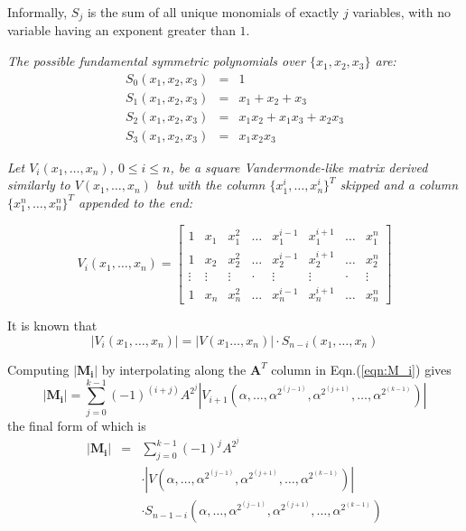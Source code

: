 Informally, $S_j$ is the sum of all unique monomials of exactly $j$ variables, with no variable
having an exponent greater than $1$.
\begin{Example}
{\it The possible fundamental symmetric polynomials over $\{x_1,x_2,x_3\}$ are:
\begin{eqnarray}
S_0(x_1,x_2,x_3) &=& 1 \nonumber \\
S_1(x_1,x_2,x_3) &=& x_1+x_2+x_3 \nonumber \\
S_2(x_1,x_2,x_3) &=& x_1x_2+x_1x_3+x_2x_3 \nonumber \\
S_3(x_1,x_2,x_3) &=& x_1x_2x_3 \nonumber 
\end{eqnarray}
}
\end{Example}

\begin{Proposition}
{\it
Let $V_i(x_1,\dots,x_n)$, $0\leq i\leq n$, be a square Vandermonde-like matrix
derived similarly to $V(x_1,\dots,x_n)$ but with the column $\{x_1^i,\dots,x_n^i\}^T$ skipped and 
a column $\{x_1^n,\dots,x_n^n\}^T$ appended to the end:

\begin{equation}
V_i(x_1,\dots,x_n) 
=
\begin{bmatrix}
1 & x_1 & x_1^2  & \dots  & x_1^{i-1} & x_1^{i+1} & \dots & x_1^n \\
1 & x_2 & x_2^2  & \dots  & x_2^{i-1} & x_2^{i+1} & \dots & x_2^n \\
\vdots & \vdots  & \vdots & \cdot  & \vdots    & \vdots    & \cdot & \vdots    \\
1 & x_n & x_n^2  & \dots  & x_n^{i-1} & x_n^{i+1} & \dots & x_n^n
\end{bmatrix} 
\end{equation}


It is known that
\begin{equation}
|V_i(x_1,\dots,x_n)| = |V(x_1\dots,x_n)|\cdot S_{n-i}(x_1,\dots,x_n)
\end{equation}
}
\end{Proposition}

Computing $|\mathbf{M_i}|$ by interpolating along the $\mathbf{A}^T$ column in Eqn.(\ref{eqn:M_i}) gives
\begin{equation}
|\mathbf{M_i}|=\sum\limits_{j=0}^{k-1}(-1)^{(i+j)}A^{2^j}
|V_{i+1}(\alpha,\dots,\alpha^{2^(j-1)},\alpha^{2^(j+1)},\dots,\alpha^{2^(k-1)})|
\end{equation}
the final form of which is
\begin{eqnarray}
|\mathbf{M_i}| &=& \sum\limits_{j=0}^{k-1}(-1)^{j}A^{2^j} \nonumber \\
& & \cdot |V(\alpha,\dots,\alpha^{2^(j-1)},\alpha^{2^(j+1)},\dots,\alpha^{2^(k-1)})| \nonumber \\
& & \cdot S_{n-1-i}(\alpha,\dots,\alpha^{2^(j-1)},\alpha^{2^(j+1)},\dots,\alpha^{2^(k-1)}) \label{eqn:Mireduced}
\end{eqnarray}

